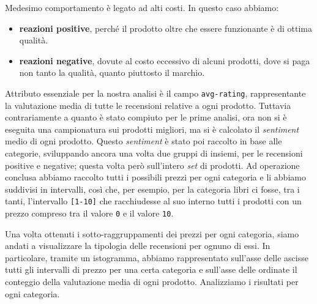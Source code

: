 			Medesimo comportamento è legato ad alti costi. In questo caso abbiamo:
			
			\begin{itemize}
				\item \textbf{reazioni positive}, perché il prodotto oltre che essere funzionante è di ottima qualità.
				\item \textbf{reazioni negative}, dovute al costo eccessivo di alcuni prodotti, dove si paga non tanto la qualità, quanto piuttosto il marchio.
			\end{itemize}
		
			Attributo essenziale per la nostra analisi è il campo \verb|avg-rating|, rappresentante la valutazione media di tutte le recensioni relative a ogni prodotto. Tuttavia contrariamente a quanto è stato compiuto per le prime analisi, ora non si è eseguita una campionatura sui prodotti migliori, ma si è calcolato il \textit{sentiment} medio di ogni prodotto. Questo \textit{sentiment} è stato poi raccolto in base alle categorie, sviluppando ancora una volta due gruppi di insiemi, per le recensioni positive e negative; questa volta però sull'intero \textit{set} di prodotti. Ad operazione conclusa abbiamo raccolto tutti i possibili prezzi per ogni categoria e li abbiamo suddivisi in intervalli, così che, per esempio, per la categoria libri ci fosse, tra i tanti, l'intervallo \verb|[1-10]| che racchiudesse al suo interno tutti i prodotti con un prezzo compreso tra il valore \verb|0| e il valore \verb|10|. 
	
			Una volta ottenuti i sotto-raggruppamenti dei prezzi per ogni categoria, siamo andati a visualizzare la tipologia delle recensioni per ognuno di essi. In particolare, tramite un istogramma, abbiamo rappresentato sull'asse delle ascisse tutti gli intervalli di prezzo per una certa categoria e sull'asse delle ordinate il conteggio della valutazione media di ogni prodotto. Analizziamo i risultati per ogni categoria.
			
